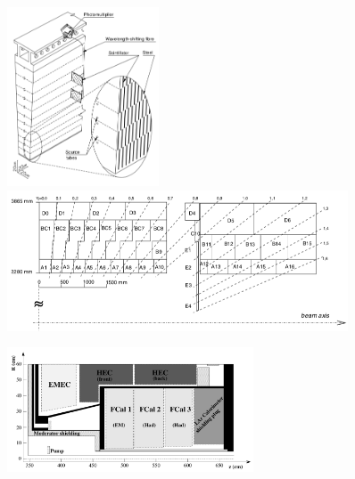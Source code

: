 \begin{figure}[!htb]
    \begin{center}
        \includegraphics[width=0.4\textwidth]{figures/chapter2/calorimeters/atlas_tile_module}
        \includegraphics[width=0.9\textwidth]{figures/chapter2/calorimeters/atlas_tile_plan_view}
        \caption{
        }
        \label{fig:tile_calo}
    \end{center}
\end{figure}

\begin{figure}[!htb]
    \begin{center}
        \includegraphics[width=0.65\textwidth]{figures/chapter2/calorimeters/atlas_fcal}
        \caption{
        }
        \label{fig:fcal}
    \end{center}
\end{figure}
